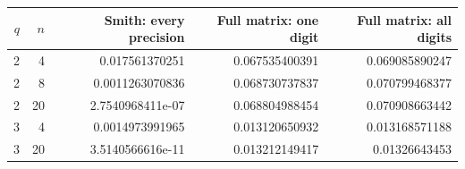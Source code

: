 \begin{tabular}{rrrrr}
\toprule
$q$ & $n$ & Smith: every precision & Full matrix: one digit & Full matrix: all digits\\
\midrule
2 & 4 & 0.017561370251 & 0.067535400391 & 0.069085890247\\
2 & 8 & 0.0011263070836 & 0.068730737837 & 0.070799468377\\
2 & 20 & 2.7540968411e-07 & 0.068804988454 & 0.070908663442\\
3 & 4 & 0.0014973991965 & 0.013120650932 & 0.013168571188\\
3 & 20 & 3.5140566616e-11 & 0.013212149417 & 0.01326643453\\
\bottomrule
\end{tabular}
